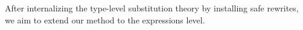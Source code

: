 \documentclass[manuscript,screen,review,anonymous,acmsmall]{acmart}
\begin{document}

After internalizing the type-level substitution theory by installing safe rewrites, we aim to
extend our method to the expressions level.

%
\end{document}
